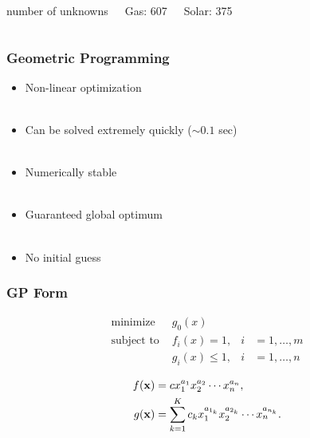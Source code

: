 \documentclass{beamer}
\begin{document}
\begin{frame}
    \pause
    \begin{columns}
    \begin{center}
       number of unknowns
    \end{center}
    \begin{columns}
        \begin{center}
        Gas: 607 
        \end{center}
        
        \begin{center}
        Solar: 375
        \end{center}
        
    \end{columns}
    \end{columns}

\end{frame}

\begin{frame}
    \frametitle{Geometric Programming}
    \begin{itemize}
        \pause
        \item Non-linear optimization \\~\\
        \pause
        \item Can be solved extremely quickly ($\sim 0.1$ sec)\\~\\
        \pause
        \item Numerically stable \\~\\
        \pause
        \item Guaranteed global optimum \\~\\
        \pause
        \item No initial guess
        \end{itemize}
\end{frame}

\begin{frame}
    \frametitle{GP Form}

        \begin{align*}
            \text{minimize } &g_0(x) \\
            \text{subject to } &f_i(x) = 1, &i &= 1,\dots,m\\
                               &g_i(x) \leq 1, &i &= 1,\dots,n
        \end{align*}

        \begin{align*}
            f(\bold{x}) &= c x_1^{a_1} x_2^{a_2} \dotsm x_n^{a_n} , \\
            g(\bold{x}) &= \displaystyle\sum_{k=1}^K c_k x_1^{a_{1_k}} x_2^{a_{2_k}} \dotsm x_n^{a_{n_k}}.
        \end{align*}

\end{frame}
\end{document}
